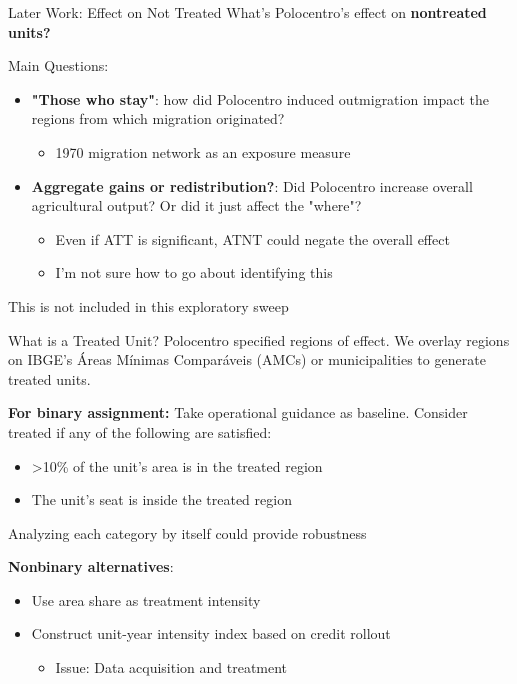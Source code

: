 \documentclass[aspectratio=169]{beamer}
\begin{document}
\begin{frame}{Later Work: Effect on Not Treated}
What's Polocentro's effect on \textbf{nontreated units?}
\vspace{1em}

Main Questions:
\begin{itemize}
    \item \textbf{"Those who stay"}: how did Polocentro induced outmigration impact the regions from which migration originated?
    \begin{itemize}
        \item 1970 migration network as an exposure measure
    \end{itemize}
\vspace{1em}
    \item \textbf{Aggregate gains or redistribution?}: Did Polocentro increase overall agricultural output? Or did it just affect the "where"?
    \begin{itemize}
        \item Even if ATT is significant, ATNT could negate the overall effect
        \item I'm not sure how to go about identifying this
    \end{itemize}
    \end{itemize}
    
This is not included in this exploratory sweep

\end{frame}

\begin{frame}{What is a Treated Unit?}
Polocentro specified regions of effect. We overlay regions on IBGE's Áreas Mínimas Comparáveis (AMCs) or municipalities to generate treated units.
\vspace{0.5em}

\textbf{For binary assignment:} Take operational guidance as baseline. Consider treated if any of the following are satisfied:
\begin{itemize}
    \item >10\% of the unit's area is in the treated region
    \item The unit's seat is inside the treated region
\end{itemize}
Analyzing each category by itself could provide robustness

\textbf{Nonbinary alternatives}:
\begin{itemize}
    \item Use area share as treatment intensity    
    \item Construct unit-year intensity index based on credit rollout
    \begin{itemize}
        \item Issue: Data acquisition and treatment 
    \end{itemize}
\end{itemize}
\end{frame}
\end{document}
